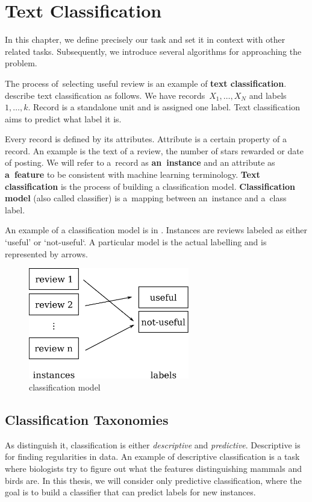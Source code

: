\chapter{Text Classification}\label{chap:cls}

In this chapter, we define precisely our task and set it in context with other related tasks.
Subsequently, we introduce several algorithms for approaching the problem.

The process of~selecting useful review is an example of {\bf text classification}.
\citet{AggZhai12} describe text classification as follows.
We have records~$X_1, \ldots, X_N$ and labels~$1,\ldots, k$.
Record is a standalone unit and is assigned one label.
Text classification aims to predict what label it is.

Every record is defined by its attributes.
Attribute is a certain property of a record.
An example is the text of a review, the number of stars rewarded or date of posting.
We will refer to a~record as \textbf{an~instance} and an attribute as \textbf{a~feature} to be consistent with machine learning terminology.
{\bf Text classification} is the process of building a classification model.
{\bf Classification model} (also called classifier) is a~mapping between an~instance and a~class label.

An example of a classification model is in .
Instances are reviews labeled as either `useful' or `not-useful`.
A particular model is the actual labelling and is represented by arrows.

\begin{figure}[h]
	\centering
	\includegraphics[width=7cm]{figures/model.eps}
	\caption{classification model} \label{fig:cls_model}
\end{figure}


\section{Classification Taxonomies}

As \citet{TanBachKum08} distinguish it, classification is either {\it descriptive} and {\it predictive}.
Descriptive is for finding regularities in data.
An example of descriptive classification is a task where
biologists try to figure out what the features distinguishing mammals and birds are.
In this thesis, we will consider only predictive classification, where the goal is to build a classifier
that can predict labels for new instances.

